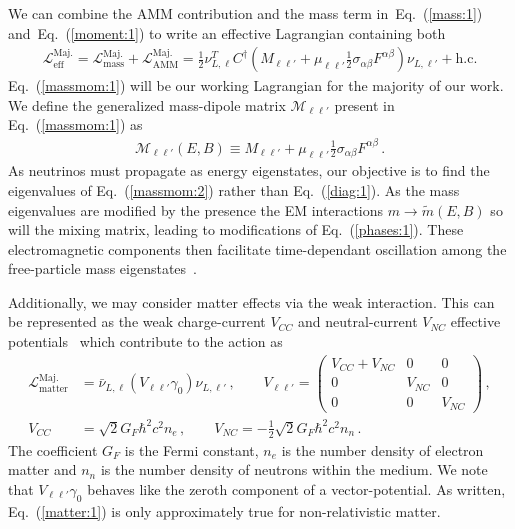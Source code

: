 \documentclass[addchapnum]{ws-rv961x669} %
\newcommand{\req}[1]{Eq.~(\ref{#1})}
\begin{document}
We can combine the AMM contribution and the mass term in~\req{mass:1} and~\req{moment:1} to write an effective Lagrangian containing both
\begin{align}
	\label{massmom:1}
    \mathcal{L}_\mathrm{eff}^\mathrm{Maj.} =
    \mathcal{L}_\mathrm{mass}^\mathrm{Maj.} + \mathcal{L}_\mathrm{AMM}^\mathrm{Maj.} = 
    \frac{1}{2}\nu_{L,\ell}^{T}C^{\dag}\left(M_{\ell\ell'}+\mu_{\ell\ell'}\frac{1}{2}\sigma_{\alpha\beta}F^{\alpha\beta}\right)\nu_{L,\ell'}+\mathrm{h.c.}
\end{align}
\req{massmom:1} will be our working Lagrangian for the majority of our work. We define the generalized mass-dipole matrix $\mathcal{M}_{\ell\ell'}$ present in \req{massmom:1} as
\begin{align}
	\label{massmom:2}
    \mathcal{M}_{\ell\ell'}(E,B)\equiv M_{\ell\ell'}+\mu_{\ell\ell'}\frac{1}{2}\sigma_{\alpha\beta}F^{\alpha\beta}\,.
\end{align}
As neutrinos must propagate as energy eigenstates, our objective is to find the eigenvalues of \req{massmom:2} rather than \req{diag:1}. As the mass eigenvalues are modified by the presence the EM interactions $m\rightarrow\widetilde m(E,B)$ so will the mixing matrix, leading to modifications of \req{phases:1}. These electromagnetic components then facilitate time-dependant oscillation among the free-particle mass eigenstates~\cite{Giunti:2014ixa}.

Additionally, we may consider matter effects via the weak interaction. This can be represented as the weak charge-current $V_{CC}$ and neutral-current $V_{NC}$ effective potentials~\cite{Pal:1991pm,greiner2009gauge} which contribute to the action as
\begin{align}
    \label{matter:1}
    \mathcal{L}_\mathrm{matter}^\mathrm{Maj.} &= \bar\nu_{L,\ell}(V_{\ell\ell'}\gamma_{0})\nu_{L,\ell'}\,,\qquad
    V_{\ell\ell'} = 
    \begin{pmatrix}
        V_{CC}+V_{NC} & 0 & 0\\
        0 & V_{NC} & 0\\
        0 & 0 & V_{NC}
    \end{pmatrix}\,,\\
    V_{CC} &= \sqrt{2}G_{F}\hbar^{2}c^{2}n_{e}\,,\qquad V_{NC} = -\frac{1}{2}\sqrt{2}G_{F}\hbar^{2}c^{2}n_{n}\,.
\end{align}
The coefficient $G_{F}$ is the Fermi constant, $n_{e}$ is the number density of electron matter and $n_{n}$ is the number density of neutrons within the medium. We note that $V_{\ell\ell'}\gamma_{0}$ behaves like the zeroth component of a vector-potential. As written, \req{matter:1} is only approximately true for non-relativistic matter.
\end{document}
